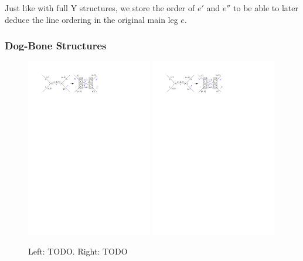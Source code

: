 \documentclass[sigconf]{acmart}
\begin{document}
Just like with full Y structures, we store the order of $e'$ and $e''$ to be able to later deduce the line ordering in the original main leg $e$.

\subsubsection{Dog-Bone Structures}

\begin{figure}[t]
  \includegraphics[width=0.49\textwidth, page=1]{untangling/dogbone.pdf}
  \hfill
  \includegraphics[width=0.49\textwidth, page=2]{untangling/dogbone.pdf}
  \caption{Left: TODO. Right: TODO}  
  \label{FIG:untangle_dogbone}
\end{figure}
\end{document}

